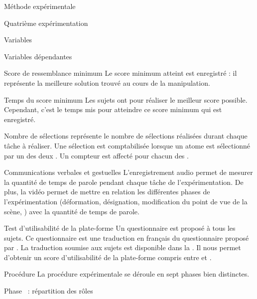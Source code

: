 \documentclass[myfrancais]{mythesis}
\begin{document}
\begin{mychapter}{Méthode expérimentale}
\begin{mysection}{Quatrième expérimentation}
\begin{mysubsection}{Variables}
\begin{mysubsubsection}{Variables dépendantes}
\begin{myparagraph}{ Score de ressemblance minimum}
						Le score minimum atteint est enregistré : il représente la meilleure solution trouvé au cours de la manipulation.
					\end{myparagraph}
					\begin{myparagraph}{ Temps du score  minimum}
						Les sujets ont  pour réaliser le meilleur score  possible.
						Cependant, c'est le temps mis pour atteindre ce score minimum qui est enregistré.
					\end{myparagraph}
					\begin{myparagraph}{ Nombre de sélections}
						 représente le nombre de sélections réalisées durant chaque tâche à réaliser.
						Une sélection est comptabilisée lorsque un atome est sélectionné par un des deux .
						Un compteur est affecté pour chacun des .
					\end{myparagraph}
					\begin{myparagraph}{ Communications verbales et gestuelles}
						L'enregistrement audio permet de mesurer la quantité de temps de parole pendant chaque tâche de l'expérimentation.
						De plus, la vidéo permet de mettre en relation les différentes phases de l'expérimentation (déformation, désignation, modification du point de vue de la scène, \myetc) avec la quantité de temps de parole.
					\end{myparagraph}
					\begin{myparagraph}{ Test d'utilisabilité de la plate-forme}
						Un questionnaire est proposé à tous les sujets.
						Ce questionnaire est une traduction en français du questionnaire  proposé par .
						La traduction soumise aux sujets est disponible dans la .
						Il nous permet d'obtenir un score d'utilisabilité de la plate-forme compris entre  et .
					\end{myparagraph}
				\end{mysubsubsection}
			\end{mysubsection}
			\begin{mysubsection}{Procédure}
				La procédure expérimentale se déroule en sept phases bien distinctes.
				\begin{myparagraph}{Phase~ : répartition des rôles}

\end{myparagraph}
\end{mysubsection}
\end{mysection}
\end{mychapter}
\end{document}
